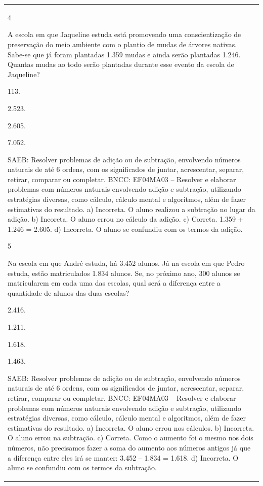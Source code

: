 \begin{mdframed}[linewidth=2pt,linecolor=salmao,roundcorner=2pt]
\begin{escolha}
{{{\begin{longtable}[]{@{}l@{}}
\begin{itemize}
{\num{4}

A escola em que Jaqueline estuda está promovendo uma conscientização de
preservação do meio ambiente com o plantio de mudas de árvores
nativas. Sabe-se que já foram plantadas 1.359 mudas e ainda serão
plantadas 1.246. Quantas mudas ao todo serão plantadas durante esse
evento da escola de Jaqueline?

\begin{escolha}
\item
  113.
\item
  2.523.
\item
  2.605.
\item
  7.052.
\end{escolha}

SAEB: Resolver problemas de adição ou de subtração, envolvendo números
naturais de até 6 ordens, com os significados de juntar, acrescentar,
separar, retirar, comparar ou completar.
BNCC: EF04MA03 -- Resolver e elaborar problemas com números naturais envolvendo adição e subtração,
utilizando estratégias diversas, como cálculo, cálculo mental e algoritmos, além de fazer estimativas
do resultado.
a) Incorreta. O aluno realizou a subtração no lugar da adição.
b) Incoreta. O aluno errou no cálculo da adição.
c) Correta. 1.359 + 1.246 = 2.605.
d) Incorreta. O aluno se confundiu com os termos da adição.

\num{5}

Na escola em que André estuda, há 3.452 alunos. Já na escola em que
Pedro estuda, estão matriculados 1.834 alunos. Se, no próximo ano, 300
alunos se matricularem em cada uma das escolas, qual será a diferença
entre a quantidade de alunos das duas escolas?

\begin{escolha}
\item
  2.416.
\item
  1.211.
\item
  1.618.
\item
  1.463.
\end{escolha}

SAEB: Resolver problemas de adição ou de subtração, envolvendo números
naturais de até 6 ordens, com os significados de juntar, acrescentar,
separar, retirar, comparar ou completar.
BNCC: EF04MA03 -- Resolver e elaborar problemas com números naturais envolvendo adição e subtração,
utilizando estratégias diversas, como cálculo, cálculo mental e algoritmos, além de fazer estimativas
do resultado.
a) Incorreta. O aluno errou nos cálculos.
b) Incorreta. O aluno errou na subtração.
c) Correta. Como o aumento foi o mesmo nos dois números, não
precisamos fazer a soma do aumento aos números antigos já que a
diferença entre eles irá se manter: 3.452 -- 1.834 = 1.618.
d) Incorreta. O aluno se confundiu com os termos da subtração.

}
\end{itemize}
\end{longtable}}}}
\end{escolha}
\end{mdframed}
